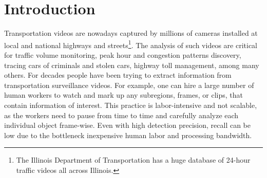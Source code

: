 \section{Introduction}
\label{sec:scene-intro}

Transportation videos are nowadays captured by millions of cameras installed at local and national highways and streets\footnote{The Illinois Department of Transportation has a huge database of 24-hour traffic videos all across Illinois.}.
The analysis of such videos are critical for traffic volume monitoring, peak hour and congestion patterns discovery, tracing cars of criminals and stolen cars, highway toll management, among many others.
For decades people have been trying to extract information from transportation surveillance videos.
For example, one can hire a large number of human workers to watch and mark up any subregions, frames, or clips, that contain information of interest.
This practice is labor-intensive and not scalable,
as the workers need to pause from time to time and carefully analyze each individual object frame-wise.
Even with high detection precision, recall can be low due to the bottleneck inexpensive human labor and processing bandwidth.


